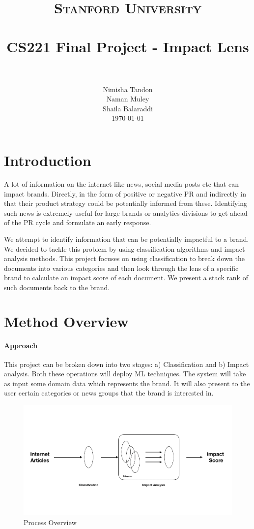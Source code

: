 \documentclass[paper=a4, fontsize=11pt]{scrartcl}
\title{
		\usefont{OT1}{bch}{b}{n}
		\normalfont \normalsize \textsc{Stanford University} \\ [25pt]
		\horrule{0.5pt} \\[0.4cm]
		\huge CS221 Final Project - Impact Lens \\
		\horrule{2pt} \\[0.5cm]
}
\author{
		\normalfont 								\normalsize
        Nimisha Tandon\\[-3pt]		\normalsize
        Naman Muley\\[-3pt]		\normalsize
        Shaila Balaraddi\\[-3pt]		\normalsize
        \today
}
\date{}
\numberwithin{equation}{section}		%
\numberwithin{figure}{section}			%
\numberwithin{table}{section}				%
\begin{document}
\maketitle
\section{Introduction}
A lot of information on the internet like news, social media posts etc that can impact brands. Directly, in the form of positive or negative PR and indirectly in that their product strategy could be potentially informed from these. Identifying such news is extremely useful for large brands or analytics divisions to get ahead of the PR cycle and formulate an early response.

\par We attempt to identify information that can be potentially impactful to a brand. We decided to tackle this problem by using classification algorithms and impact analysis methods. This project focuses on using classification to break down the documents into various categories and then look through the lens of a specific brand to calculate an impact score of each document. We present a stack rank of such documents back to the brand.

\section{Method Overview}
\paragraph{Approach}
This project can be broken down into two stages: a) Classification and b) Impact analysis. Both these operations will deploy ML techniques. The system will take as input some domain data which represents the brand. It will also present to the user certain categories or news groups that the brand is interested in.

\begin{figure}
	\centering
 	 \includegraphics[width=0.6\linewidth]{impact_score.png}
	  \caption{Process Overview}
 	 \label{fig:Impact Potential}
\end{figure}
\end{document}
